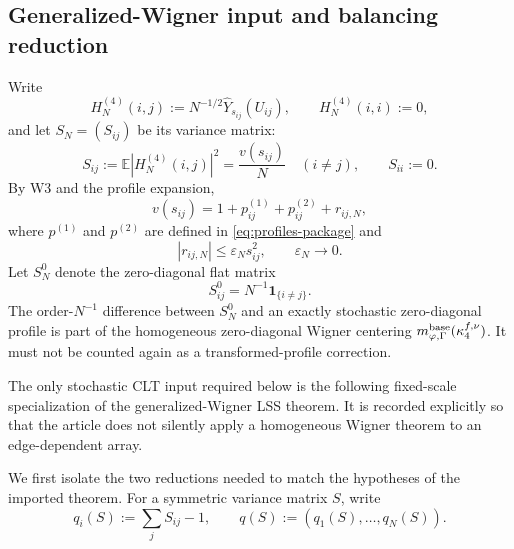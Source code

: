 \documentclass[11pt]{article}
\theoremstyle{definition}
\theoremstyle{remark}
\newcommand{\E}{\mathbb E}
\newcommand{\one}{\mathbf 1}
\begin{document}
\subsection{Generalized-Wigner input and balancing reduction}

Write
\begin{equation}\label{eq:R3-centered-array}
 H_N^{(4)}(i,j):=N^{-1/2}\widehat Y_{s_{ij}}(U_{ij}),
 \qquad H_N^{(4)}(i,i):=0,
\end{equation}
and let \(S_N=(S_{ij})\) be its variance matrix:
\begin{equation}\label{eq:R3-variance-matrix}
 S_{ij}:=\E|H_N^{(4)}(i,j)|^2
 =\frac{v(s_{ij})}{N}\quad(i\ne j),
 \qquad S_{ii}:=0.
\end{equation}
By W3 and the profile expansion,
\begin{equation}\label{eq:R3-p-decomposition}
 v(s_{ij})=1+p_{ij}^{(1)}+p_{ij}^{(2)}+r_{ij,N},
\end{equation}
where \(p^{(1)}\) and \(p^{(2)}\) are defined in
\eqref{eq:profiles-package} and
\begin{equation}\label{eq:R3-rem-bound}
 |r_{ij,N}|\le\varepsilon_Ns_{ij}^2,\qquad \varepsilon_N\to0.
\end{equation}
Let \(S_N^0\) denote the zero-diagonal flat matrix
\begin{equation}\label{eq:R3-flat-S}
 S_{ij}^0=N^{-1}\one_{\{i\ne j\}}.
\end{equation}
The order-\(N^{-1}\) difference between \(S_N^0\) and an exactly stochastic
zero-diagonal profile is part of the homogeneous zero-diagonal Wigner
centering \(m_{\varphi,\Gamma}^{\rm base}(\kappa_4^{f,\nu})\).  It must not be counted again as
a transformed-profile correction.

The only stochastic CLT input required below is the following
fixed-scale specialization of the generalized-Wigner LSS theorem.  It is
recorded explicitly so that the article does not silently apply a homogeneous
Wigner theorem to an edge-dependent array.

We first isolate the two reductions needed to match the hypotheses of the
imported theorem.  For a symmetric variance matrix \(S\), write
\[
 q_i(S):=\sum_jS_{ij}-1,
 \qquad
 q(S):=(q_1(S),\ldots,q_N(S)).
\]
\end{document}
